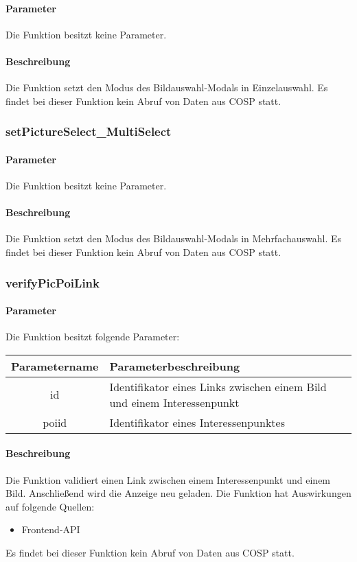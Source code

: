 \paragraph{Parameter} Die Funktion besitzt keine Parameter.
\paragraph{Beschreibung} Die Funktion setzt den Modus des Bildauswahl-Modals in Einzelauswahl. Es findet bei dieser Funktion kein Abruf von Daten aus {\glqq COSP\grqq} statt.
\subsubsection{setPictureSelect\_MultiSelect}
\paragraph{Parameter} Die Funktion besitzt keine Parameter.
\paragraph{Beschreibung} Die Funktion setzt den Modus des Bildauswahl-Modals in Mehrfachauswahl. Es findet bei dieser Funktion kein Abruf von Daten aus {\glqq COSP\grqq} statt.
\subsubsection{verifyPicPoiLink}
\paragraph{Parameter} Die Funktion besitzt folgende Parameter:
\begin{table}[H]
	\begin{tabular}{|c|p{11cm}|}
		\hline
		\textbf{Parametername} & \textbf{Parameterbeschreibung} \\ \hline
		id    & Identifikator eines Links zwischen einem Bild und einem Interessenpunkt \\ \hline
		poiid & Identifikator eines Interessenpunktes \\ \hline
	\end{tabular}
\end{table}
\paragraph{Beschreibung} Die Funktion validiert einen Link zwischen einem Interessenpunkt und einem Bild. Anschließend wird die Anzeige neu geladen. Die Funktion hat Auswirkungen auf folgende Quellen:
\begin{itemize}
	\item Frontend-API
\end{itemize}
Es findet bei dieser Funktion kein Abruf von Daten aus {\glqq COSP\grqq} statt.
